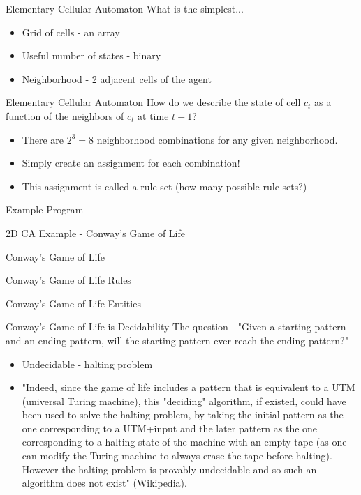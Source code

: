 \documentclass[bigger]{beamer}
\begin{document}
\begin{frame}[label=sec-10]{Elementary Cellular Automaton}
What is the simplest...
\begin{itemize}
\item<1->Grid of cells - an array
\item<1->Useful number of states - binary
\item<1->Neighborhood - 2 adjacent cells of the agent
\end{itemize}
\end{frame}

\begin{frame}[label=sec-11]{Elementary Cellular Automaton}
How do we describe the state of cell \(c_t\) as a function of the neighbors of \(c_t\) at time \(t-1\)?
\begin{itemize}
\item<1->There are \(2^3 = 8\) neighborhood combinations for any given neighborhood.
\item<2->Simply create an assignment for each combination!
\item<3->This assignment is called a rule set (how many possible rule sets?)
\end{itemize}
\end{frame}

\begin{frame}[label=sec-12]{Example Program}
\end{frame}

\begin{frame}[label=sec-13]{2D CA Example - Conway's Game of Life}
\end{frame}
\begin{frame}[label=sec-14]{Conway's Game of Life}
\end{frame}
\begin{frame}[label=sec-15]{Conway's Game of Life Rules}
\end{frame}
\begin{frame}[label=sec-16]{Conway's Game of Life Entities}
\end{frame}
\begin{frame}[label=sec-17]{Conway's Game of Life is Decidability}
The question - "Given a starting pattern and an ending pattern, will the starting pattern ever reach the ending pattern?"
\begin{itemize}
\item<2->Undecidable - halting problem
\item<3->"Indeed, since the game of life includes a pattern that is equivalent to a UTM (universal Turing machine), this "deciding" algorithm, if existed, could have been used to solve the halting problem, by taking the initial pattern as the one corresponding to a UTM+input and the later pattern as the one corresponding to a halting state of the machine with an empty tape (as one can modify the Turing machine to always erase the tape before halting). However the halting problem is provably undecidable and so such an algorithm does not exist" (Wikipedia).
\end{itemize}
\end{frame}
\end{document}
